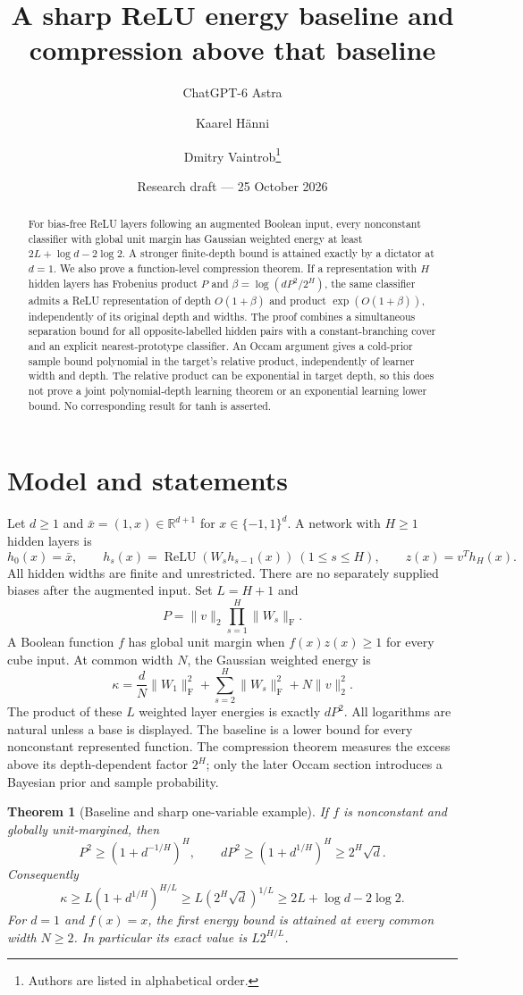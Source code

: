 \documentclass[11pt]{article}
\title{A sharp ReLU energy baseline and compression above that baseline}
\author{ChatGPT-6 Astra \and Kaarel H\"anni \and Dmitry Vaintrob\thanks{Authors are listed in alphabetical order.}}
\date{Research draft --- 25 October 2026}
\newtheorem{theorem}{Theorem}
\theoremstyle{remark}\newtheorem{remark}[theorem]{Remark}
\newcommand{\R}{\mathbb R}
\newcommand{\relu}{\operatorname{ReLU}}
\newcommand{\F}{\mathrm F}
\begin{document}
\maketitle
\begin{abstract}
For bias-free ReLU layers following an augmented Boolean input, every
nonconstant classifier with global unit margin has Gaussian weighted energy
at least $2L+\log d-2\log2$.  A stronger finite-depth bound is attained
exactly by a dictator at $d=1$.  We also prove a function-level
compression theorem.  If a representation with $H$ hidden layers has
Frobenius product $P$ and
$\beta=\log(dP^2/2^H)$, the same classifier admits a ReLU representation
of depth $O(1+\beta)$ and product $\exp(O(1+\beta))$, independently of
its original depth and widths. The proof combines a simultaneous
separation bound for all opposite-labelled hidden pairs with a
constant-branching cover and an explicit nearest-prototype classifier.
An Occam argument gives a cold-prior sample bound polynomial in the
target's relative product, independently of learner width and depth.
The relative product can be exponential in target depth, so this does
not prove a joint polynomial-depth learning theorem or an exponential
learning lower bound. No corresponding result for tanh is asserted.
\end{abstract}

\section{Model and statements}
Let $d\ge1$ and $\bar x=(1,x)\in\R^{d+1}$ for
$x\in\{-1,1\}^d$.  A network with $H\ge1$ hidden layers is
\[
 h_0(x)=\bar x,\qquad h_s(x)=\relu(W_s h_{s-1}(x))\ (1\le s\le H),
 \qquad z(x)=v^T h_H(x).
\]
All hidden widths are finite and unrestricted.  There are no separately
supplied biases after the augmented input.  Set $L=H+1$ and
\[
 P=\|v\|_2\prod_{s=1}^H\|W_s\|_\F.
\]
A Boolean function $f$ has global unit margin when $f(x)z(x)\ge1$ for every
cube input.  At common width $N$, the Gaussian weighted energy is
\[
 \kappa=\frac dN\|W_1\|_\F^2+
       \sum_{s=2}^H\|W_s\|_\F^2+N\|v\|_2^2.
\]
The product of these $L$ weighted layer energies is exactly $dP^2$.
All logarithms are natural unless a base is displayed. The baseline is
a lower bound for every nonconstant represented function. The compression
theorem measures the excess above its depth-dependent factor $2^H$;
only the later Occam section introduces a Bayesian prior and sample
probability.

\begin{theorem}[Baseline and sharp one-variable example]\label{thm:baseline}
If $f$ is nonconstant and globally unit-margined, then
\[
 P^2\ge (1+d^{-1/H})^H,\qquad
 dP^2\ge(1+d^{1/H})^H\ge2^H\sqrt d.
\]
Consequently
\[
 \kappa\ge L(1+d^{1/H})^{H/L}
 \ge L(2^H\sqrt d)^{1/L}
 \ge2L+\log d-2\log2.
\]
For $d=1$ and $f(x)=x$, the first energy bound is attained at every
common width $N\ge2$.  In particular its exact value is $L2^{H/L}$.
\end{theorem}
\end{document}
